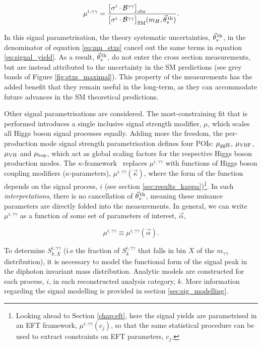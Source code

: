 \begin{equation}\label{eq:mu_stxs}
    \mu^{i,\gamma\gamma} = \frac{\big[\sigma^i \cdot \mathcal{B}^{\gamma\gamma} \big]_{\rm{obs}}\hfill}{\big[\sigma^i \cdot \mathcal{B}^{\gamma\gamma} \big]_{\rm{SM}}(m_H,\vec{\theta}^{\,\rm{th}}_{s})}.
\end{equation}

\noindent
In this signal parametrisation, the theory systematic uncertainties, $\vec{\theta}^{\,\rm{th}}_{s}$, in the denominator of equation \ref{eq:mu_stxs} cancel out the same terms in equation \ref{eq:signal_yield}. As a result, $\vec{\theta}^{\,\rm{th}}_{s}$, do not enter the cross section measurements, but are instead attributed to the uncertainty in the SM predictions (see grey bands of Figure \ref{fig:stxs_maximal}). This property of the measurements has the added benefit that they remain useful in the long-term, as they can accommodate future advances in the SM theoretical predictions.

Other signal parametrisations are considered. The most-constraining fit that is performed introduces a single inclusive signal strength modifier, $\mu$, which scales all Higgs boson signal processes equally. Adding more the freedom, the per-production mode signal strength parametrisation defines four POIs: $\mu_{\rm{ggH}}$, $\mu_{\rm{VBF}}$, $\mu_{\rm{VH}}$ and $\mu_{\rm{top}}$, which act as global scaling factors for the respective Higgs boson production modes. The $\kappa$-framework~\cite{Heinemeyer:2013tqa} replaces $\mu^{i,\gamma\gamma}$ with functions of Higgs boson coupling modifiers ($\kappa$-parameters), $\mu^{i,\gamma\gamma}(\vec{\kappa})$, where the form of the function depends on the signal process, $i$ (see section \ref{sec:results_kappa})\footnote{Looking ahead to Section \ref{chap:eft}, here the signal yields are parametrised in an EFT framework, $\mu^{i,\gamma\gamma}(c_j)$, so that the same statistical procedure can be used to extract constraints on EFT parameters, $c_j$.}. In such \textit{interpretations}, there is no cancellation of $\vec{\theta}^{\,\rm{th}}_{s}$, meaning these nuisance parameters are directly folded into the measurements. In general, we can write $\mu^{i,\gamma\gamma}$ as a function of some set of parameters of interest, $\vec{\alpha}$,

\begin{equation}
    \mu^{i,\gamma\gamma} \equiv \mu^{i,\gamma\gamma}(\vec{\alpha}).
\end{equation}

To determine $S_{k,X}^{i,\gamma\gamma}$ (i.e the fraction of $S_k^{i,\gamma\gamma}$ that falls in bin $X$ of the $m_{\gamma\gamma}$ distribution), it is necessary to model the functional form of the signal peak in the diphoton invariant mass distribution. Analytic models are constructed for each process, $i$, in each reconstructed analysis category, $k$. More information regarding the signal modelling is provided in section \ref{sec:sig_modelling}.

